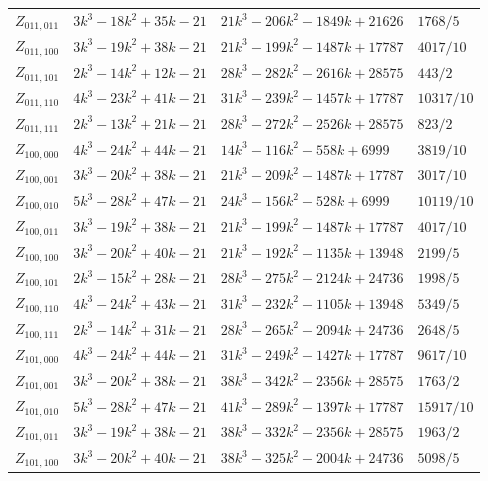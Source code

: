 \documentclass[11pt]{amsart}
\theoremstyle{definition}
\theoremstyle{remark}
\newcommand{\1}{\mathbf 1}
\begin{document}
{\begin{longtable}{@{}llll@{}}
$Z_{011,011}$ & $3 k^{3} - 18 k^{2} + 35 k - 21$ & $21 k^{3} - 206 k^{2} - 1849 k + 21626$ & $1768 / 5$\\
$Z_{011,100}$ & $3 k^{3} - 19 k^{2} + 38 k - 21$ & $21 k^{3} - 199 k^{2} - 1487 k + 17787$ & $4017 / 10$\\
$Z_{011,101}$ & $2 k^{3} - 14 k^{2} + 12 k - 21$ & $28 k^{3} - 282 k^{2} - 2616 k + 28575$ & $443 / 2$\\
$Z_{011,110}$ & $4 k^{3} - 23 k^{2} + 41 k - 21$ & $31 k^{3} - 239 k^{2} - 1457 k + 17787$ & $10317 / 10$\\
$Z_{011,111}$ & $2 k^{3} - 13 k^{2} + 21 k - 21$ & $28 k^{3} - 272 k^{2} - 2526 k + 28575$ & $823 / 2$\\
$Z_{100,000}$ & $4 k^{3} - 24 k^{2} + 44 k - 21$ & $14 k^{3} - 116 k^{2} - 558 k + 6999$ & $3819 / 10$\\
$Z_{100,001}$ & $3 k^{3} - 20 k^{2} + 38 k - 21$ & $21 k^{3} - 209 k^{2} - 1487 k + 17787$ & $3017 / 10$\\
$Z_{100,010}$ & $5 k^{3} - 28 k^{2} + 47 k - 21$ & $24 k^{3} - 156 k^{2} - 528 k + 6999$ & $10119 / 10$\\
$Z_{100,011}$ & $3 k^{3} - 19 k^{2} + 38 k - 21$ & $21 k^{3} - 199 k^{2} - 1487 k + 17787$ & $4017 / 10$\\
$Z_{100,100}$ & $3 k^{3} - 20 k^{2} + 40 k - 21$ & $21 k^{3} - 192 k^{2} - 1135 k + 13948$ & $2199 / 5$\\
$Z_{100,101}$ & $2 k^{3} - 15 k^{2} + 28 k - 21$ & $28 k^{3} - 275 k^{2} - 2124 k + 24736$ & $1998 / 5$\\
$Z_{100,110}$ & $4 k^{3} - 24 k^{2} + 43 k - 21$ & $31 k^{3} - 232 k^{2} - 1105 k + 13948$ & $5349 / 5$\\
$Z_{100,111}$ & $2 k^{3} - 14 k^{2} + 31 k - 21$ & $28 k^{3} - 265 k^{2} - 2094 k + 24736$ & $2648 / 5$\\
$Z_{101,000}$ & $4 k^{3} - 24 k^{2} + 44 k - 21$ & $31 k^{3} - 249 k^{2} - 1427 k + 17787$ & $9617 / 10$\\
$Z_{101,001}$ & $3 k^{3} - 20 k^{2} + 38 k - 21$ & $38 k^{3} - 342 k^{2} - 2356 k + 28575$ & $1763 / 2$\\
$Z_{101,010}$ & $5 k^{3} - 28 k^{2} + 47 k - 21$ & $41 k^{3} - 289 k^{2} - 1397 k + 17787$ & $15917 / 10$\\
$Z_{101,011}$ & $3 k^{3} - 19 k^{2} + 38 k - 21$ & $38 k^{3} - 332 k^{2} - 2356 k + 28575$ & $1963 / 2$\\
$Z_{101,100}$ & $3 k^{3} - 20 k^{2} + 40 k - 21$ & $38 k^{3} - 325 k^{2} - 2004 k + 24736$ & $5098 / 5$\\

\end{longtable}}
\end{document}
